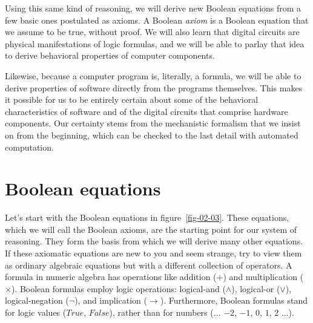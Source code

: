 Using this same kind of reasoning, we will derive new Boolean equations
from a few basic ones postulated as axioms.
A Boolean \emph{axiom} is a Boolean equation
that we assume to be true, without proof.
We will also learn that digital circuits are physical
manifestations of logic formulas, and we will be able to
parlay that idea to derive behavioral properties of
computer components.

Likewise, because a computer program is,
literally, a formula, we will be able to derive
properties of software directly from the programs themselves.
This makes it possible for us to be entirely
certain about some of the behavioral characteristics of
software and of the digital circuits that
comprise hardware components.
Our certainty stems from the mechanistic
formalism that we insist on from the beginning,
which can be checked to the last detail with automated computation.

\begin{exercises}


\end{exercises}

\section{Boolean equations}
\label{sec:boolean-equations}
Let's start with the Boolean equations in
figure~\ref{fig-02-03}.
These equations, which we will call the
Boolean axioms,
are the starting point for our system of reasoning.
They form the basis from which we will derive
many other equations.
If these axiomatic equations
are new to you and seem strange,
try to view them as ordinary
algebraic equations but with a different collection of operators.
A formula in numeric algebra has operations like addition
($+$) and multiplication ($\times$). Boolean formulas employ logic
operations: logical-and ($\wedge$), logical-or ($\vee$),
logical-negation ($\neg$), and implication ($\rightarrow$).
Furthermore, Boolean formulas stand for logic values
($True$, $False$), rather than for numbers ($\dots$ $-2$, $-1$, $0$, $1$, $2$ $\dots$).

